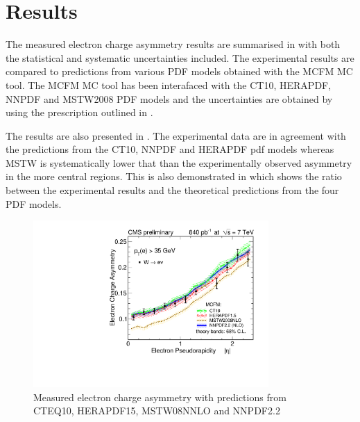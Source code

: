 \section{Results}
The measured electron charge asymmetry results are summarised in
 with both the statistical and systematic
uncertainties included. The experimental results are compared to predictions
from various PDF models obtained with the MCFM\cite{campbellmcfm} MC tool.  The
MCFM MC tool has been interafaced with the CT10\cite{lai2010vv},
HERAPDF\cite{aaron2010combined}, NNPDF\cite{Lionetti:2011pw} and
MSTW2008\cite{martin2009parton} PDF models and  the uncertainties are obtained
by using the prescription outlined in .

The results are also presented in . The experimental
data are in agreement with the predictions from the CT10, NNPDF and HERAPDF pdf
models whereas MSTW is systematically lower that than the experimentally
observed asymmetry in the more central regions. This is also demonstrated in
 which shows the ratio between the experimental results
and the theoretical predictions from the four PDF models.

\begin{figure}[htbp]
  \begin{center}
\includegraphics*[width=0.80\textwidth]{updated_asym}
  \caption{\label{fig:updated_asym} Measured electron charge asymmetry with predictions from CTEQ10, HERAPDF15, MSTW08NNLO and NNPDF2.2}
  \end{center}
\end{figure}

